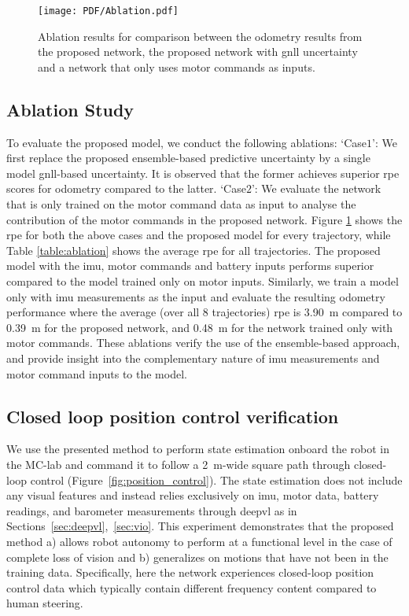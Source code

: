 \begin{figure}
    \centering
    \texttt{[image: PDF/Ablation.pdf]}
    \caption{Ablation results for comparison between the odometry results from the proposed network, the proposed network with \ac{gnll} uncertainty and a network that only uses motor commands as inputs.} 
    \label{fig:ablation}
\end{figure}

\subsection{Ablation Study}\label{subsection:ablation}
To evaluate the proposed model, we conduct the following ablations: `Case$1$': We first replace the proposed ensemble-based predictive uncertainty by a single model \ac{gnll}-based uncertainty. It is observed that the former achieves superior \ac{rpe} scores for odometry compared to the latter. `Case$2$': We evaluate the network that is only trained on the motor command data as input to analyse the contribution of the motor commands in the proposed network. Figure \ref{fig:ablation} shows the \ac{rpe} for both the above cases and the proposed model for every trajectory, while Table \ref{table:ablation} shows the average \ac{rpe} for all trajectories. The proposed  model with the \ac{imu}, motor commands and battery inputs performs superior compared to the model trained only on motor inputs. Similarly, we train a model only with \ac{imu} measurements as the input and evaluate the resulting odometry performance where the average (over all $8$ trajectories) \ac{rpe} is \SI{3.90}{\meter} compared to \SI{0.39}{\meter} for the proposed network, and \SI{0.48}{\meter} for the network trained only with motor commands. These ablations verify the use of the ensemble-based approach, and provide insight into the complementary nature of \ac{imu} measurements and motor command inputs to the model.

\subsection{Closed loop position control verification}
We use the presented method to perform state estimation onboard the robot in the MC-lab and command it to follow a \SI{2}{\meter}-wide square path through closed-loop control (Figure~\ref{fig:position_control}). The state estimation does not include any visual features and instead relies exclusively on \ac{imu}, motor data, battery readings, and barometer measurements through \ac{deepvl} as in Sections~\ref{sec:deepvl},~\ref{sec:vio}. This experiment demonstrates that the proposed method a) allows robot autonomy to perform at a functional level in the case of complete loss of vision and b) generalizes on motions that have not been in the training data. Specifically, here the network experiences closed-loop position control data which typically contain different frequency content compared to human steering. 


